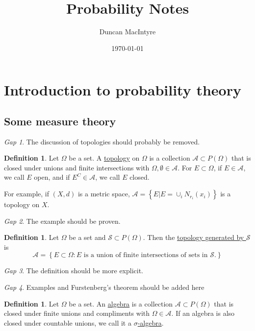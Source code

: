 \documentclass[11pt]{article}
\newcommand{\col}[1]{\mathscr{#1}}
\newcommand{\pset}[1]{P\left(#1\right)}
\newcommand{\defname}[1]{\underline{#1}}
\theoremstyle{theorem}
\theoremstyle{definition}
\newtheorem{definition}[theorem]{Definition}
\theoremstyle{remark}
\theoremstyle{step}
\theoremstyle{gap}
\newtheorem*{gap}{Gap}
\begin{document}
\title{Probability Notes}
\author{Duncan MacIntyre}
\date{\today}
\maketitle
\tableofcontents
\bigskip
\newpage

\section{Introduction to probability theory}

\subsection{Some measure theory}

\begin{gap}
The discussion of topologies should probably be removed.
\end{gap}


\begin{definition}
Let \(\Omega\) be a set. A \defname{topology} on \(\Omega\) is a collection \(\col{A} \subset \pset{\Omega}\) that is closed under unions and finite intersections with \(\Omega, \emptyset \in \col{A}\). For \(E \subset \Omega\), if \(E \in \col{A}\), we call \(E\) open, and if \(E^C \in \col{A}\), we call \(E\) closed.
\end{definition}

For example, if \((X, d)\) is a metric space, \(\col{A} = \left\{E | E = \cup_i N_{r_i} \left(x_i\right)\right\}\) is a topology on \(X\).

\begin{gap} The example should be proven.\end{gap}

\begin{definition}
Let \(\Omega\) be a set and \(\col{S} \subset \pset{\Omega}\). Then the \defname{topology generated by \(\col{S}\)} is
\[\col{A} = \left\{E \subset \Omega : E \text{ is a union of finite intersections of sets in } \col{S}.\right\}\]
\end{definition}

\begin{gap} The definition should be more explicit.\end{gap}

\begin{gap} Examples and Furstenberg's theorem should be added here \end{gap}

\begin{definition}
Let \(\Omega\) be a set. An \defname{algebra} is a collection \(\col{A} \subset \pset{\Omega}\) that is closed under finite unions and compliments with \(\Omega \in \col{A}\). If an algebra is also closed under countable unions, we call it a \defname{\(\sigma\)-algebra}.
\end{definition}
\end{document}
